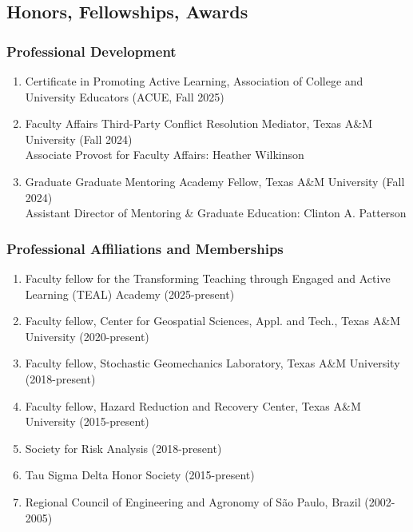\documentclass[11pt,oneside]{article}
\begin{document}
\subsection{Honors, Fellowships, Awards}

\subsubsection{Professional Development}
\begin{enumerate}[leftmargin=40pt]
\item {Certificate in Promoting Active Learning,} Association of College and University Educators (ACUE, Fall 2025)
\item Faculty Affairs Third-Party Conflict Resolution Mediator, Texas A\&M University (Fall 2024)\\
      Associate Provost for Faculty Affairs: Heather Wilkinson
\item Graduate Graduate Mentoring Academy Fellow, Texas A\&M University (Fall 2024)\\
      Assistant Director of Mentoring \& Graduate Education: Clinton A. Patterson
\end{enumerate}

\subsubsection{Professional Affiliations and Memberships}
\begin{enumerate}[leftmargin=40pt]
\item {Faculty fellow for the Transforming Teaching through Engaged and Active Learning (TEAL) Academy} (2025-present)
\item Faculty fellow, Center for Geospatial Sciences, Appl. and Tech., Texas A\&M University (2020-present)
\item Faculty fellow, Stochastic Geomechanics Laboratory, Texas A\&M University (2018-present)
\item Faculty fellow, Hazard Reduction and Recovery Center, Texas A\&M University (2015-present)
\item Society for Risk Analysis (2018-present)
\item Tau Sigma Delta Honor Society (2015-present)
\item Regional Council of Engineering and Agronomy of São Paulo, Brazil (2002-2005)
\end{enumerate}
\end{document}
